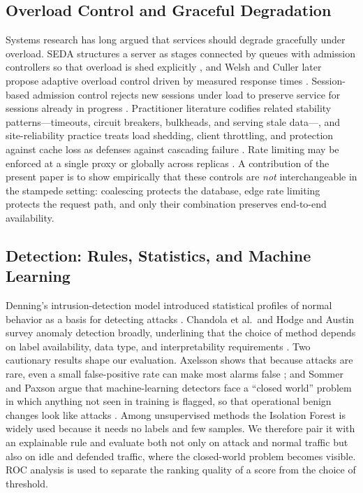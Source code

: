 \documentclass[preprint,12pt]{elsarticle}
\begin{document}
\subsection{Overload Control and Graceful Degradation}
Systems research has long argued that services should degrade gracefully under
overload. SEDA structures a server as stages connected by queues with admission
controllers so that overload is shed explicitly \cite{welsh2001}, and Welsh and Culler
later propose adaptive overload control driven by measured response times
\cite{welsh2003}. Session-based admission control rejects new sessions under load to
preserve service for sessions already in progress \cite{cherkasova2002}. Practitioner
literature codifies related stability patterns---timeouts, circuit breakers, bulkheads,
and serving stale data---\cite{nygard2018}, and site-reliability practice treats load
shedding, client throttling, and protection against cache loss as defenses against
cascading failure \cite{beyer2016}. Rate limiting may be enforced at a single proxy or
globally across replicas \cite{raghavan2007}. A contribution of the present paper is to
show empirically that these controls are \emph{not} interchangeable in the stampede
setting: coalescing protects the database, edge rate limiting protects the request
path, and only their combination preserves end-to-end availability.

\subsection{Detection: Rules, Statistics, and Machine Learning}
Denning's intrusion-detection model introduced statistical profiles of normal behavior
as a basis for detecting attacks \cite{denning1987}. Chandola et al.\ and Hodge and
Austin survey anomaly detection broadly, underlining that the choice of method
depends on label availability, data type, and interpretability requirements
\cite{chandola2009,hodge2004}. Two cautionary results shape our evaluation. Axelsson
shows that because attacks are rare, even a small false-positive rate can make most
alarms false \cite{axelsson2000}; and Sommer and Paxson argue that machine-learning
detectors face a ``closed world'' problem in which anything not seen in training is
flagged, so that operational benign changes look like attacks \cite{sommer2010}. Among
unsupervised methods the Isolation Forest \cite{liu2008,liu2012} is widely used because
it needs no labels and few samples. We therefore pair it with an explainable rule and
evaluate both not only on attack and normal traffic but also on idle and defended
traffic, where the closed-world problem becomes visible. ROC analysis \cite{fawcett2006}
is used to separate the ranking quality of a score from the choice of threshold.
\end{document}
